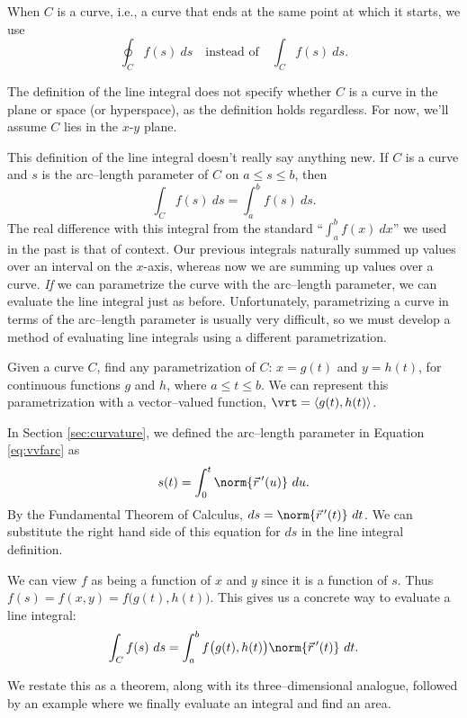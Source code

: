 When $C$ is a  curve, i.e., a curve that ends at the same point at which it starts,  we use $$\oint_C f(s)\ ds \quad \text{instead of}\quad \int_Cf(s)\ ds.$$

The definition of the line integral does not specify whether $C$ is a curve in the plane or space (or hyperspace), as the definition holds regardless. For now, we'll assume $C$ lies in the $x$-$y$ plane.

This definition of the line integral  doesn't really say anything new. If $C$ is a curve and $s$ is the arc--length parameter of $C$ on $a\leq s\leq b$, then 
$$\int_Cf(s)\ ds = \int_a^bf(s)\ ds.$$
The real difference with this integral from the standard ``$\int_a^bf(x)\ dx$'' we used in the past is that of context. Our previous integrals naturally summed up values over an interval on the $x$-axis, whereas now we are summing up values over a curve. \emph{If} we can parametrize the curve with the arc--length parameter, we can evaluate the line integral just as before. Unfortunately, parametrizing a curve in terms of the arc--length parameter is usually very difficult, so we must develop a method of evaluating line integrals using a different parametrization.


Given a curve $C$, find any parametrization of $C$: $x = g(t)$ and $y=h(t)$, for continuous functions $g$ and $h$, where $a\leq t\leq b$. We can represent this parametrization with a vector--valued function, $\vrt = \langle g(t),h(t)\rangle$.

In Section \ref{sec:curvature}, we defined the arc--length parameter in Equation \ref{eq:vvfarc} as 
$$
s(t) = \int_0^t \norm{\vec r\,'(u)}\ du. 
$$
By the Fundamental Theorem of Calculus, $ds = \norm{\vec r\,'(t)}\ dt$. We can substitute the right hand side of this equation for $ds$ in the line integral definition.

We can view $f$ as being a function of $x$ and $y$ since it is a function of $s$. Thus $f(s) =f(x,y) =f\big(g(t),h(t)\big)$. This gives us a concrete way to evaluate a line integral:
$$\int_C f(s)\ ds = \int_a^bf\big(g(t),h(t)\big)\norm{\vec r\,'(t)}\ dt.$$

We restate this as a theorem, along with its three--dimensional analogue, followed by an example where we finally evaluate an integral and find an area.

